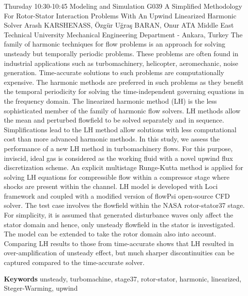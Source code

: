 
    \begin{abstract_basarim}
    {Thursday 10:30-10:45}
    {Modeling and Simulation}
    {G039}
    {A Simplified Methodology For Rotor-Stator Interaction Problems With An Upwind Linearized Harmonic Solver}
    {%
    Arash KARSHENASS, Özgür Uğraş BARAN, Onur ATA}
    {%
    }
    {%
    Middle East Technical University Mechanical Engineering Department - Ankara, Turkey}
    The family of harmonic techniques for flow problems is an approach for solving unsteady but temporally periodic problems. These problems are often found in industrial applications such as turbomachinery, helicopter, aeromechanic, noise generation. Time-accurate solutions to such problems are computationally expensive. The harmonic methods are preferred in such problems as they benefit the temporal periodicity for solving the time-independent governing equations in the frequency domain. The linearized harmonic method (LH) is the less sophisticated member of the family of harmonic flow solvers. LH methods allow the mean and perturbed flowfield to be solved separately and in sequence. Simplifications lead to the LH method allow solutions with less computational cost than more advanced harmonic methods. In this study, we assess the performance of a new LH method in turbomachinery flows. For this purpose, inviscid, ideal gas is considered as the working fluid with a novel upwind flux discretization scheme. An explicit multistage Runge-Kutta method is applied for solving LH equations for compressible flow within a compressor stage where shocks are present within the channel. LH model is developed with Loci framework and coupled with a modified version of flowPsi open-source CFD solver. The test case involves the flowfield within the NASA rotor-stator37 stage. For simplicity, it is assumed that generated disturbance waves only affect the stator domain and hence, only unsteady flowfield in the stator is investigated. The model can be extended to take the rotor domain also into account. Comparing LH results to those from time-accurate shows that LH resulted in over-amplification of unsteady effect, but much sharper discontinuities can be captured compared to the time-accurate solver. 
    
        \textbf{Keywords} \newline{}unsteady, turbomachine, stage37, rotor-stator, harmonic, linearized, Steger-Warming, upwind
    \end{abstract_basarim}
    